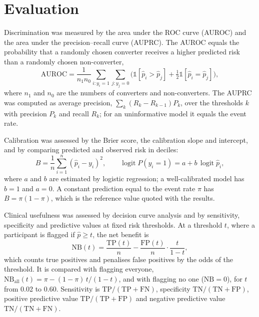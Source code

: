 \section{Evaluation}

Discrimination was measured by the area under the ROC curve (AUROC) and the area under the precision--recall curve (AUPRC). The AUROC equals the probability that a randomly chosen converter receives a higher predicted risk than a randomly chosen non-converter,
\begin{equation}
\text{AUROC} = \frac{1}{n_1 n_0} \sum_{i: y_i = 1} \sum_{j: y_j = 0} \Big( \mathbb{1}[\hat{p}_i > \hat{p}_j] + \tfrac{1}{2}\mathbb{1}[\hat{p}_i = \hat{p}_j] \Big),
\end{equation}
where $n_1$ and $n_0$ are the numbers of converters and non-converters. The AUPRC was computed as average precision, $\sum_k (R_k - R_{k-1}) P_k$, over the thresholds $k$ with precision $P_k$ and recall $R_k$; for an uninformative model it equals the event rate.

Calibration was assessed by the Brier score, the calibration slope and intercept, and by comparing predicted and observed risk in deciles:
\begin{equation}
B = \frac{1}{n}\sum_{i=1}^{n} (\hat{p}_i - y_i)^2, \qquad
\operatorname{logit} P(y_i = 1) = a + b\, \operatorname{logit} \hat{p}_i,
\end{equation}
where $a$ and $b$ are estimated by logistic regression; a well-calibrated model has $b = 1$ and $a = 0$. A constant prediction equal to the event rate $\pi$ has $B = \pi(1 - \pi)$, which is the reference value quoted with the results.

Clinical usefulness was assessed by decision curve analysis \cite{vickers2006} and by sensitivity, specificity and predictive values at fixed risk thresholds. At a threshold $t$, where a participant is flagged if $\hat{p} \ge t$, the net benefit is
\begin{equation}
\text{NB}(t) = \frac{\text{TP}(t)}{n} - \frac{\text{FP}(t)}{n} \cdot \frac{t}{1 - t},
\end{equation}
which counts true positives and penalises false positives by the odds of the threshold. It is compared with flagging everyone, $\text{NB}_{\text{all}}(t) = \pi - (1 - \pi)\, t/(1 - t)$, and with flagging no one ($\text{NB} = 0$), for $t$ from 0.02 to 0.60. Sensitivity is $\text{TP}/(\text{TP} + \text{FN})$, specificity $\text{TN}/(\text{TN} + \text{FP})$, positive predictive value $\text{TP}/(\text{TP} + \text{FP})$ and negative predictive value $\text{TN}/(\text{TN} + \text{FN})$.

